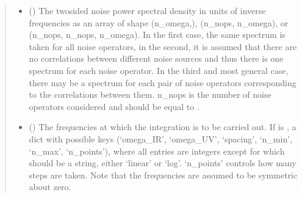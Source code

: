 \documentclass[letterpaper,10pt,english]{sphinxmanual}
\begin{document}
\begin{fulllineitems}
\begin{quote}
\begin{description}
\begin{itemize}
\item {} 
 (\sphinxstyleliteralemphasis{\sphinxupquote{{[}}}\sphinxstyleliteralemphasis{\sphinxupquote{{[}}}\sphinxstyleliteralemphasis{\sphinxupquote{{]}}}\sphinxstyleliteralemphasis{\sphinxupquote{, }}\sphinxstyleliteralemphasis{\sphinxupquote{{]}}}) \textendash{} The two\sphinxhyphen{}sided noise power spectral density in units of inverse
frequencies as an array of shape (n\_omega,), (n\_nops, n\_omega), or
(n\_nops, n\_nops, n\_omega). In the first case, the same spectrum is
taken for all noise operators, in the second, it is assumed that there
are no correlations between different noise sources and thus there is
one spectrum for each noise operator. In the third and most general
case, there may be a spectrum for each pair of noise operators
corresponding to the correlations between them. n\_nops is the number of
noise operators considered and should be equal to
.

\item {} 
 (\sphinxstyleliteralemphasis{\sphinxupquote{{[}}}\sphinxstyleliteralemphasis{\sphinxupquote{{[}}}\sphinxstyleliteralemphasis{\sphinxupquote{{]}}}\sphinxstyleliteralemphasis{\sphinxupquote{, }}\sphinxstyleliteralemphasis{\sphinxupquote{{[}}}\sphinxstyleliteralemphasis{\sphinxupquote{, }}\sphinxstyleliteralemphasis{\sphinxupquote{{[}}}\sphinxstyleliteralemphasis{\sphinxupquote{, }}\sphinxstyleliteralemphasis{\sphinxupquote{{]}}}\sphinxstyleliteralemphasis{\sphinxupquote{{]}}}\sphinxstyleliteralemphasis{\sphinxupquote{{]}}}) \textendash{} The frequencies at which the integration is to be carried out. If
 is , a dict with possible keys (‘omega\_IR’,
‘omega\_UV’, ‘spacing’, ‘n\_min’, ‘n\_max’, ‘n\_points’), where all
entries are integers except for  which should be a string,
either ‘linear’ or ‘log’. ‘n\_points’ controls how many steps are taken.
Note that the frequencies are assumed to be symmetric about zero.


\end{itemize}
\end{description}
\end{quote}
\end{fulllineitems}
\end{document}
